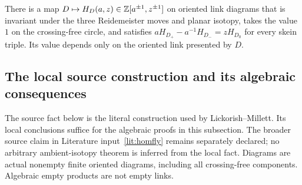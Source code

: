 \begin{literature}\label{lit:homfly}
There is a map $D\mapsto H_D(a,z)\in\mathbb Z[a^{\pm1},z^{\pm1}]$ on oriented
link diagrams that is invariant under the three Reidemeister moves and planar
isotopy, takes the value $1$ on the crossing-free circle, and satisfies
$aH_{D_+}-a^{-1}H_{D_-}=zH_{D_0}$ for every skein triple. Its value depends
only on the oriented link presented by $D$.
\end{literature}

\subsection{The local source construction and its algebraic consequences}

The source fact below is the literal construction used by
Lickorish--Millett. Its local conclusions suffice for the algebraic
proofs in this subsection. The broader source claim in
Literature input~\ref{lit:homfly} remains separately declared; no
arbitrary ambient-isotopy theorem is inferred from the local fact.
Diagrams are actual nonempty finite oriented diagrams, including all
crossing-free components. Algebraic empty products are not empty links.

